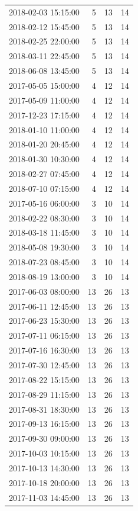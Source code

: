 \begin{tabular}{lrrr}
2018-02-03 15:15:00 & 5 & 13 & 14 \\
2018-02-12 15:45:00 & 5 & 13 & 14 \\
2018-02-25 22:00:00 & 5 & 13 & 14 \\
2018-03-11 22:45:00 & 5 & 13 & 14 \\
2018-06-08 13:45:00 & 5 & 13 & 14 \\
2017-05-05 15:00:00 & 4 & 12 & 14 \\
2017-05-09 11:00:00 & 4 & 12 & 14 \\
2017-12-23 17:15:00 & 4 & 12 & 14 \\
2018-01-10 11:00:00 & 4 & 12 & 14 \\
2018-01-20 20:45:00 & 4 & 12 & 14 \\
2018-01-30 10:30:00 & 4 & 12 & 14 \\
2018-02-27 07:45:00 & 4 & 12 & 14 \\
2018-07-10 07:15:00 & 4 & 12 & 14 \\
2017-05-16 06:00:00 & 3 & 10 & 14 \\
2018-02-22 08:30:00 & 3 & 10 & 14 \\
2018-03-18 11:45:00 & 3 & 10 & 14 \\
2018-05-08 19:30:00 & 3 & 10 & 14 \\
2018-07-23 08:45:00 & 3 & 10 & 14 \\
2018-08-19 13:00:00 & 3 & 10 & 14 \\
2017-06-03 08:00:00 & 13 & 26 & 13 \\
2017-06-11 12:45:00 & 13 & 26 & 13 \\
2017-06-23 15:30:00 & 13 & 26 & 13 \\
2017-07-11 06:15:00 & 13 & 26 & 13 \\
2017-07-16 16:30:00 & 13 & 26 & 13 \\
2017-07-30 12:45:00 & 13 & 26 & 13 \\
2017-08-22 15:15:00 & 13 & 26 & 13 \\
2017-08-29 11:15:00 & 13 & 26 & 13 \\
2017-08-31 18:30:00 & 13 & 26 & 13 \\
2017-09-13 16:15:00 & 13 & 26 & 13 \\
2017-09-30 09:00:00 & 13 & 26 & 13 \\
2017-10-03 10:15:00 & 13 & 26 & 13 \\
2017-10-13 14:30:00 & 13 & 26 & 13 \\
2017-10-18 20:00:00 & 13 & 26 & 13 \\
2017-11-03 14:45:00 & 13 & 26 & 13 \\

\end{tabular}
